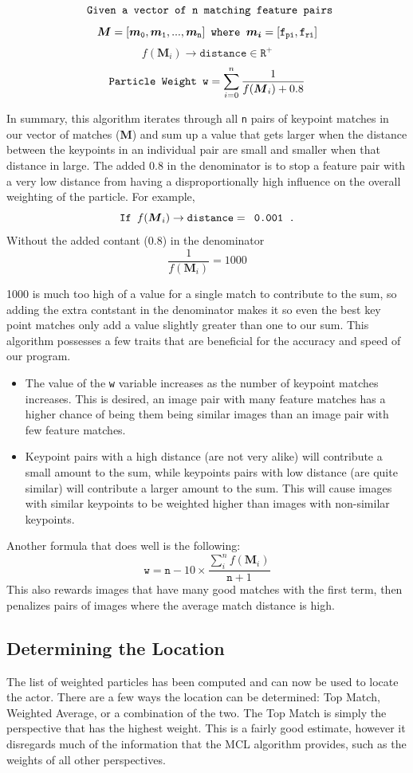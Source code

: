 \documentclass[a4paper,11pt]{article}
\begin{document}
\[  \verb. Given a vector of . \mathtt{n} \verb. matching feature pairs. \]
\[  \boldsymbol{M} = \mathtt{ [\boldsymbol{m}_0, \boldsymbol{m}_1, ... , \boldsymbol{m}_n} ]  \verb. where . \boldsymbol{m_i} = \mathtt{ \mathtt{[f_{pi}, f_{ri}]} }   \]
\[  f(\boldsymbol{M}_i) \to \mathtt{distance} \in \mathtt{R^+}   \]
\[  \verb.Particle Weight . \mathtt{w} = \sum_{i=0}^{n} \frac 1{f(\boldsymbol{M}_i) + 0.8} \]

In summary, this algorithm iterates through all \texttt{n} pairs of keypoint matches in our vector of matches (\textbf{M}) and sum up a value that gets larger when the distance between the keypoints in an individual pair are small and smaller when that distance in large. The added 0.8 in the denominator is to stop a feature pair with a very low distance from having a disproportionally high influence on the overall weighting of the particle. For example,
\[ \verb.If . f(\boldsymbol{M}_i) \to \mathtt{distance} = \verb, 0.001 ., \]
Without the added contant (0.8) in the denominator
\[ \frac 1{f(\boldsymbol{M}_i)} = 1000\]

1000 is much too high of a value for a single match to contribute to the sum, so adding the extra contstant in the denominator makes it so even the best key point matches only add a value slightly greater than one to our sum. This algorithm possesses a few traits that are beneficial for the accuracy and speed of our program.
\begin{itemize}
  \item The value of the \texttt{w} variable increases as the number of keypoint matches increases. This is desired, an image pair with many feature matches has a higher chance of being them being similar images than an image pair with few  feature matches.
  \item Keypoint pairs with a high distance (are not very alike) will contribute a small amount to the sum, while keypoints pairs with low distance (are quite similar) will contribute a larger amount to the sum. This will cause images with similar keypoints to be weighted higher than images with non-similar keypoints.
\end{itemize}

Another formula that does well is the following:
\[
\mathtt{w} = \mathtt{n} - 10 \times \frac{\sum_{i}^{n} f(\boldsymbol{M}_i)}{\mathtt{n} + 1}
\]
This also rewards images that have many good matches with the first term, then penalizes pairs of images where the average match distance is high.

\subsection{Determining the Location}
The list of weighted particles has been computed and can now be used to locate the actor. There are a few ways the location can be determined: Top Match, Weighted Average, or a combination of the two. The Top Match is simply the perspective that has the highest weight. This is a fairly good estimate, however it disregards much of the information that the MCL algorithm provides, such as the weights of all other perspectives. 
\end{document}
